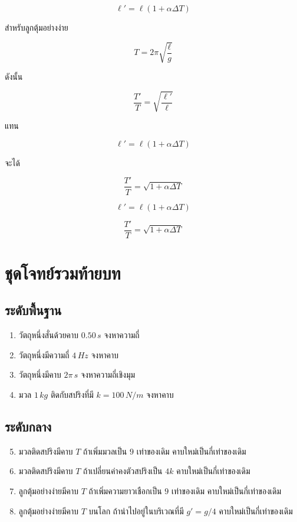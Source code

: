 \[
\ell'=\ell(1+\alpha\Delta T)
\]

สำหรับลูกตุ้มอย่างง่าย

\[
T=2\pi\sqrt{\frac{\ell}{g}}
\]

ดังนั้น

\[
\frac{T'}{T}
=
\sqrt{\frac{\ell'}{\ell}}
\]

แทน

\[
\ell'=\ell(1+\alpha\Delta T)
\]

จะได้

\[
\frac{T'}{T}
=
\sqrt{1+\alpha\Delta T}
\]

\begin{tcolorbox}[title=ลูกตุ้มกับการขยายตัวเชิงความร้อน]
\[
\ell'=\ell(1+\alpha\Delta T)
\]

\[
\frac{T'}{T}
=
\sqrt{1+\alpha\Delta T}
\]
\end{tcolorbox}

\section{ชุดโจทย์รวมท้ายบท}

\subsection*{ระดับพื้นฐาน}

\begin{enumerate}
    \item วัตถุหนึ่งสั่นด้วยคาบ $0.50\,\si{s}$ จงหาความถี่
    \item วัตถุหนึ่งมีความถี่ $4\,\si{Hz}$ จงหาคาบ
    \item วัตถุหนึ่งมีคาบ $2\pi\,\si{s}$ จงหาความถี่เชิงมุม
    \item มวล $1\,\si{kg}$ ติดกับสปริงที่มี $k=100\,\si{N/m}$ จงหาคาบ
\end{enumerate}

\subsection*{ระดับกลาง}

\begin{enumerate}
    \setcounter{enumi}{4}
    \item มวลติดสปริงมีคาบ $T$ ถ้าเพิ่มมวลเป็น $9$ เท่าของเดิม คาบใหม่เป็นกี่เท่าของเดิม
    \item มวลติดสปริงมีคาบ $T$ ถ้าเปลี่ยนค่าคงตัวสปริงเป็น $4k$ คาบใหม่เป็นกี่เท่าของเดิม
    \item ลูกตุ้มอย่างง่ายมีคาบ $T$ ถ้าเพิ่มความยาวเชือกเป็น $9$ เท่าของเดิม คาบใหม่เป็นกี่เท่าของเดิม
    \item ลูกตุ้มอย่างง่ายมีคาบ $T$ บนโลก ถ้านำไปอยู่ในบริเวณที่มี $g'=g/4$ คาบใหม่เป็นกี่เท่าของเดิม
\end{enumerate}

